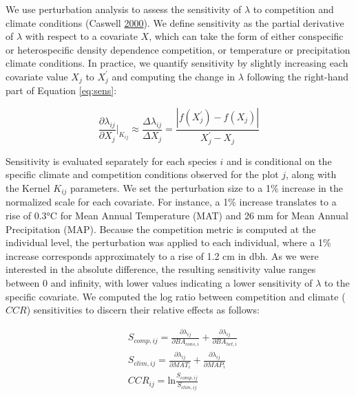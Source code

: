 \documentclass[12pt]{article}
\begin{document}
We use perturbation analysis to assess the sensitivity of \(\lambda\) to
competition and climate conditions (Caswell
\protect\hyperlink{ref-Caswell2000}{2000}). We define sensitivity as the
partial derivative of \(\lambda\) with respect to a covariate \(X\),
which can take the form of either conspecific or heterospecific density
dependence competition, or temperature or precipitation climate
conditions. In practice, we quantify sensitivity by slightly increasing
each covariate value \(X_j\) to \(X_j^{'}\) and computing the change in
\(\lambda\) following the right-hand part of Equation \ref{eq:sens}:

\begin{equation}
    \frac{\partial \lambda_{ij}}{\partial X_j} \bigg\rvert_{K_{ij}} \approx \frac{\Delta \lambda_{ij}}{\Delta X_j} = \frac{|f(X_j^{'}) - f(X_j)|}{X_j^{'} - X_j}
\label{eq:sens}\end{equation}

Sensitivity is evaluated separately for each species \(i\) and is
conditional on the specific climate and competition conditions observed
for the plot \(j\), along with the Kernel \(K_{ij}\) parameters. We set
the perturbation size to a 1\% increase in the normalized scale for each
covariate. For instance, a 1\% increase translates to a rise of 0.3°C
for Mean Annual Temperature (MAT) and 26 mm for Mean Annual
Precipitation (MAP). Because the competition metric is computed at the
individual level, the perturbation was applied to each individual, where
a 1\% increase corresponds approximately to a rise of 1.2 cm in dbh. As
we were interested in the absolute difference, the resulting sensitivity
value ranges between 0 and infinity, with lower values indicating a
lower sensitivity of \(\lambda\) to the specific covariate. We computed
the log ratio between competition and climate (\(CCR\)) sensitivities to
discern their relative effects as follows:

\begin{equation}
\begin{split}
&S_{comp, ij} = \frac{\partial \lambda_{ij}}{\partial BA_{cons, i}} + \frac{\partial \lambda_{ij}}{\partial BA_{het, i}} \\[2pt]
&S_{clim, ij} = \frac{\partial \lambda_{ij}}{\partial MAT_{i}} + \frac{\partial \lambda_{ij}}{\partial MAP_{i}} \\[2pt]
&CCR_{ij} = \text{ln} \frac{S_{comp, ij}}{S_{clim, ij}}
\end{split}
\label{eq:CCR}\end{equation}
\end{document}
